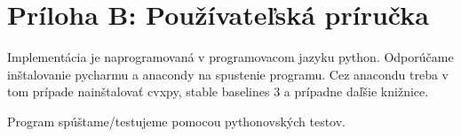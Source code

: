 \chapter*{Príloha B: Používateľská príručka}
Implementácia je naprogramovaná v programovacom jazyku python. Odporúčame inštalovanie pycharmu a anacondy na spustenie programu. Cez anacondu treba v tom prípade nainštalovať cvxpy, stable baselines 3 a prípadne daľšie knižnice. 

Program spúštame/testujeme pomocou pythonovských testov. 